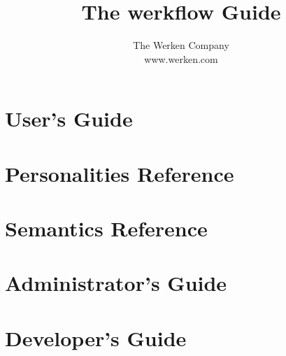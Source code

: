 \documentclass[10pt,letterpaper]{book}
\begin{document}
\let\footnoterule\hrule

\makeatletter
\renewcommand{\@makefntext}[1]%
        {\noindent\makebox[1.8em][r]{\@makefnmark}#1}
\makeatother

\title{The \textsf{werkflow} Guide}

\author{\textsf{The Werken Company}\\
        \textsf{www.werken.com}}


\frontmatter

\maketitle

\tableofcontents

\mainmatter

\part{User's Guide}





\part{Personalities Reference}





\part{Semantics Reference}







\part{Administrator's Guide}




\part{Developer's Guide}





\end{document}
